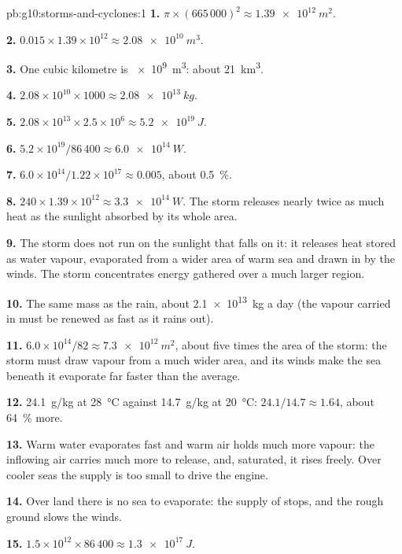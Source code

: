 \begin{solution}{pb:g10:storms-and-cyclones:1}
\textbf{1.} $\pi \times (665\,000)^2 \approx \qty{1.39e12}{m^2}$.

\textbf{2.} $0.015 \times 1.39\times10^{12} \approx \qty{2.08e10}{m^3}$.

\textbf{3.} One cubic kilometre is \qty{e9}{m^3}: about \qty{21}{km^3}.

\textbf{4.} $2.08\times10^{10} \times 1000 \approx \qty{2.08e13}{kg}$.

\textbf{5.} $2.08\times10^{13} \times 2.5\times10^6 \approx \qty{5.2e19}{J}$.

\textbf{6.} $5.2\times10^{19}/86\,400 \approx \qty{6.0e14}{W}$.

\textbf{7.} $6.0\times10^{14}/1.22\times10^{17} \approx 0.005$, about
\qty{0.5}{\percent}.

\textbf{8.} $240 \times 1.39\times10^{12} \approx \qty{3.3e14}{W}$. The storm
releases nearly twice as much heat as the sunlight absorbed by its whole area.

\textbf{9.} The storm does not run on the sunlight that falls on it: it
releases heat stored as water vapour, evaporated from a wider area of warm
sea and drawn in by the winds. The storm concentrates energy gathered over a
much larger region.

\textbf{10.} The same mass as the rain, about \qty{2.1e13}{kg} a day (the
vapour carried in must be renewed as fast as it rains out).

\textbf{11.} $6.0\times10^{14}/82 \approx \qty{7.3e12}{m^2}$, about five times
the area of the storm: the storm must draw vapour from a much wider area, and
its winds make the sea beneath it evaporate far faster than the average.

\textbf{12.} \qty{24.1}{g/kg} at \qty{28}{\degreeCelsius} against
\qty{14.7}{g/kg} at \qty{20}{\degreeCelsius}: $24.1/14.7 \approx 1.64$, about
\qty{64}{\percent} more.

\textbf{13.} Warm water evaporates fast and warm air holds much more vapour:
the inflowing air carries much more  to release, and, saturated,
it rises freely. Over cooler seas the supply is too small to drive the
engine.

\textbf{14.} Over land there is no sea to evaporate: the supply of  stops, and the rough ground slows the winds.

\textbf{15.} $1.5\times10^{12} \times 86\,400 \approx \qty{1.3e17}{J}$.


\end{solution}
